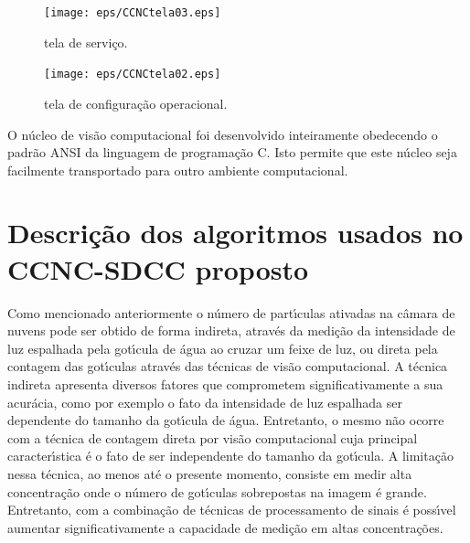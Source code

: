  \begin{figure}[!hbt]
\begin{center}
\texttt{[image: eps/CCNCtela03.eps]}\\
\end{center}
\caption{\label{CCNC_TELA03}\hspace{-0.1em} tela de servi\c{c}o.}
\end{figure}


\begin{figure}[!hbt]
\begin{center}
\texttt{[image: eps/CCNCtela02.eps]}\\
\end{center}
\caption{\label{CCNC_TELA02}\hspace{-0.1em} tela de configura\c{c}\~{a}o operacional.}
\end{figure}



O n\'{u}cleo de vis\~{a}o computacional foi desenvolvido inteiramente obedecendo o padr\~{a}o ANSI da linguagem de programa\c{c}\~{a}o C. Isto permite que este n\'{u}cleo seja facilmente transportado para outro ambiente computacional.


\section{Descri\c{c}\~{a}o dos algoritmos usados no CCNC-SDCC proposto}
Como mencionado anteriormente o n\'{u}mero de part\'{\i}culas ativadas na c\^{a}mara de nuvens pode ser obtido de forma indireta, atrav\'{e}s da medi\c{c}\~{a}o da intensidade de luz espalhada pela got\'{\i}cula de \'{a}gua ao cruzar um feixe de luz, ou direta pela contagem das got\'{\i}culas atrav\'{e}s das t\'{e}cnicas de vis\~{a}o computacional. A t\'{e}cnica indireta apresenta diversos fatores que comprometem significativamente a sua acur\'{a}cia, como por exemplo o fato da intensidade de luz espalhada ser dependente do tamanho da got\'{\i}cula de \'{a}gua. Entretanto, o mesmo n\~{a}o ocorre com a t\'{e}cnica de contagem direta por vis\~{a}o computacional cuja principal caracter\'{\i}stica \'{e} o fato de ser independente do tamanho da got\'{\i}cula. A limita\c{c}\~{a}o nessa t\'{e}cnica, ao menos at\'{e} o presente momento, consiste em medir alta concentra\c{c}\~{a}o onde o n\'{u}mero de got\'{\i}culas sobrepostas na imagem \'{e} grande. Entretanto, com a combina\c{c}\~{a}o de t\'{e}cnicas de processamento de sinais \'{e} poss\'{\i}vel aumentar significativamente a capacidade de medi\c{c}\~{a}o em altas concentra\c{c}\~{o}es.

